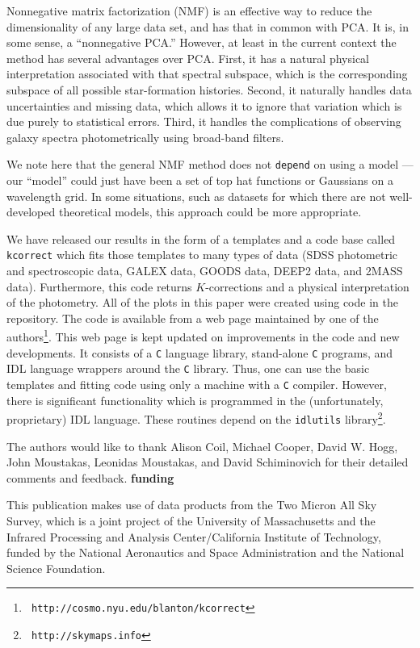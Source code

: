 \documentclass[10pt,preprint]{aastex}
\begin{document}
Nonnegative matrix factorization (NMF) is an effective way to reduce
the dimensionality of any large data set, and has that in common with
PCA.  It is, in some sense, a ``nonnegative PCA.''  However, at least
in the current context the method has several advantages over
PCA. First, it has a natural physical interpretation associated with
that spectral subspace, which is the corresponding subspace of all
possible star-formation histories. Second, it naturally handles data
uncertainties and missing data, which allows it to ignore that
variation which is due purely to statistical errors.  Third, it
handles the complications of observing galaxy spectra photometrically
using broad-band filters. 

We note here that the general NMF method does not {\tt depend} on
using a model --- our ``model'' could just have been a set of top hat
functions or Gaussians on a wavelength grid. In some situations, such
as datasets for which there are not well-developed theoretical models,
this approach could be more appropriate.

We have released our results in the form of a templates and a code
base called {\tt kcorrect} which fits those templates to many types of
data (SDSS photometric and spectroscopic data, GALEX data, GOODS data,
DEEP2 data, and 2MASS data). Furthermore, this code returns
$K$-corrections and a physical interpretation of the photometry. All
of the plots in this paper were created using code in the
repository. The code is available from a web page maintained by one of
the authors\footnote{{\tt
http://cosmo.nyu.edu/blanton/kcorrect}}. This web page is kept updated
on improvements in the code and new developments. It consists of a
{\tt C} language library, stand-alone {\tt C} programs, and IDL
language wrappers around the {\tt C} library. Thus, one can use the
basic templates and fitting code using only a machine with a {\tt C}
compiler. However, there is significant functionality which is
programmed in the (unfortunately, proprietary) IDL language. These
routines depend on the {\tt idlutils} library\footnote{{\tt
http://skymaps.info}}.

\acknowledgments

The authors would like to thank Alison Coil, Michael Cooper, David
W. Hogg, John Moustakas, Leonidas Moustakas, and David Schiminovich
for their detailed comments and feedback. {\bf funding}

This publication makes use of data products from the Two Micron All
Sky Survey, which is a joint project of the University of
Massachusetts and the Infrared Processing and Analysis
Center/California Institute of Technology, funded by the National
Aeronautics and Space Administration and the National Science
Foundation.
\end{document}
